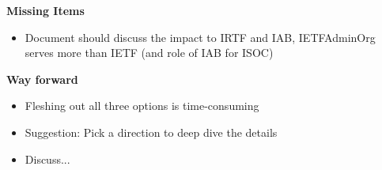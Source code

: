 \documentclass[helvetica,a4paper,landscape]{seminar}
\newcommand{\heading}[1]{%
  \begin{center} 
    \large\bf 
    #1 
  \end{center} 
  \vspace{.4 in}}
\begin{document}

\begin{slide}
\heading{Missing Items}
\begin{itemize}
\item Document should discuss the impact to IRTF and IAB, IETFAdminOrg serves more than IETF (and role of IAB for ISOC)
\end{itemize}
\end{slide}


\begin{slide}

\heading{Way forward}

\begin{itemize}
\item Fleshing out all three options is time-consuming
\item Suggestion: Pick a direction to deep dive the details
\item Discuss...
\end{itemize}

\end{slide}
\end{document}
